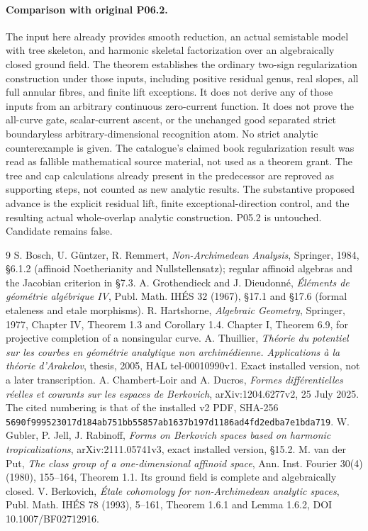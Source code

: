 \documentclass[11pt]{article}
\begin{document}
\paragraph{Comparison with original P06.2.}
The input here already provides smooth reduction, an actual
semistable model with tree skeleton, and harmonic skeletal
factorization over an algebraically closed ground field.
The theorem establishes the ordinary two-sign regularization
construction under those inputs, including positive residual
genus, real slopes, all full annular fibres, and finite lift
exceptions. It does not derive any of those inputs from an
arbitrary continuous zero-current function. It does not prove
the all-curve gate, scalar-current ascent, or the unchanged
good separated strict boundaryless arbitrary-dimensional
recognition atom. No strict analytic counterexample is given.
The catalogue's claimed book regularization result was read
as fallible mathematical source material, not used as a theorem
grant. The tree and cap calculations already present in the
predecessor are reproved as supporting steps, not counted as
new analytic results. The substantive proposed advance is
the explicit residual lift, finite exceptional-direction
control, and the resulting actual whole-overlap analytic
construction. P05.2 is untouched. Candidate remains false.

\begin{thebibliography}{9}
 S. Bosch, U. G\"untzer, R. Remmert,
\emph{Non-Archimedean Analysis}, Springer, 1984, \S6.1.2
(affinoid Noetherianity and Nullstellensatz); regular affinoid
algebras and the Jacobian criterion in \S7.3.
 A. Grothendieck and J. Dieudonn\'e,
\emph{\'El\'ements de g\'eom\'etrie alg\'ebrique IV},
Publ. Math. IH\'ES 32 (1967), \S17.1 and \S17.6
(formal etaleness and etale morphisms).
 R. Hartshorne, \emph{Algebraic Geometry},
Springer, 1977, Chapter IV, Theorem 1.3 and Corollary 1.4.
Chapter I, Theorem 6.9, for projective completion of a nonsingular curve.
 A. Thuillier, \emph{Th\'eorie du potentiel sur
les courbes en g\'eom\'etrie analytique non archim\'edienne.
Applications \`a la th\'eorie d'Arakelov}, thesis, 2005,
HAL tel-00010990v1. Exact installed version, not a later
transcription.
 A. Chambert-Loir and A. Ducros,
\emph{Formes diff\'erentielles r\'eelles et courants sur les
espaces de Berkovich}, arXiv:1204.6277v2, 25 July 2025.
The cited numbering is that of the installed v2 PDF, SHA-256
\texttt{5690f999523017d184ab751bb55857ab1637b197d1186ad4fd2edba7e1bda719}.
 W. Gubler, P. Jell, J. Rabinoff,
\emph{Forms on Berkovich spaces based on harmonic tropicalizations},
arXiv:2111.05741v3, exact installed version, \S15.2.
 M. van der Put, \emph{The class group of a
one-dimensional affinoid space}, Ann. Inst. Fourier 30(4) (1980),
155--164, Theorem 1.1. Its ground field is complete and
algebraically closed.
 V. Berkovich, \emph{\'Etale cohomology for
non-Archimedean analytic spaces}, Publ. Math. IH\'ES 78 (1993),
5--161, Theorem 1.6.1 and Lemma 1.6.2,
DOI 10.1007/BF02712916.
\end{thebibliography}
\end{document}
